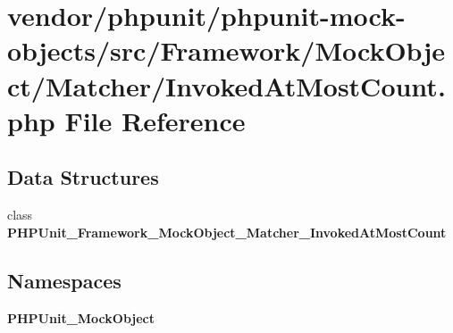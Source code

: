 \section{vendor/phpunit/phpunit-\/mock-\/objects/src/\+Framework/\+Mock\+Object/\+Matcher/\+Invoked\+At\+Most\+Count.php File Reference}
\label{_invoked_at_most_count_8php}
\subsection*{Data Structures}
\begin{DoxyCompactItemize}
\item 
class {\bf P\+H\+P\+Unit\+\_\+\+Framework\+\_\+\+Mock\+Object\+\_\+\+Matcher\+\_\+\+Invoked\+At\+Most\+Count}
\end{DoxyCompactItemize}
\subsection*{Namespaces}
\begin{DoxyCompactItemize}
\item 
 {\bf P\+H\+P\+Unit\+\_\+\+Mock\+Object}
\end{DoxyCompactItemize}
